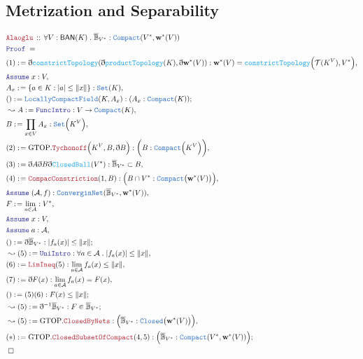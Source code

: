 \documentclass[12pt]{scrartcl}
\newcommand{\TYPE}[1]{\textcolor{NavyBlue}{\mathtt{#1}}}
\newcommand{\FUNC}[1]{\textcolor{Cerulean}{\mathtt{#1}}}
\newcommand{\LOGIC}[1]{\textcolor{Blue}{\mathtt{#1}}}
\newcommand{\THM}[1]{\textcolor{Maroon}{\mathtt{#1}}}
\renewcommand{\.}{\; . \;}
\newcommand{\de}{: \kern 0.1pc =}
\newcommand{\Theorem}[2]{& \THM{#1} \, :: \, #2 \\ & \Proof = \\ }
\newcommand{\Page}[1]{\begin{align*} #1 \end{align*} \newpage   }
\newcommand{ \bd }{ \ByDef }
\newcommand{\Say}[3]{& #1 \de #2 : #3, \\}
\newcommand{\Conclude}[3]{& #1 \de #2 : #3; \\}
\newcommand{\Derive}[3]{& \leadsto #1 \de #2 : #3, \\}
\newcommand{\DeriveConclude}[3]{& \leadsto #1 \de #2 : #3 ; \\}
\newcommand{\A}{\LOGIC{Assume} \;}
\newcommand{\Assume}[2]{& \A #1 : #2, \\}
\newcommand{\QED}{\; \square}
\newcommand{\EndProof}{& \QED \\}
\newcommand{\ByDef}{\eth}
\newcommand{\Proof}{\LOGIC{Proof} \; }
\newcommand{\BAN}{\textsf{BAN}}
\begin{document}
\subsection{Metrization and Separability }
\Page{
\Theorem{Alaoglu}{\forall V : \BAN(K) \. \overline{\mathbb{B}}_{V^*} : \TYPE{Compact}(V^*, \mathbf{w}^*(V)) }
\Say{(1)}{\bd \FUNC{constrictTopology} (\bd \FUNC{productTopology}(K),\bd \mathbf{w}^*(V))}{
\mathbf{w}^*(V) =  \FUNC{constrictTopology}\Big(\mathcal{T}(K^V),V^*\Big) 
}
\Assume{x}{V}
\Say{ A_x}{ \{ a \in K  : | a | \le \| x \|    \}}{ \TYPE{Set}(K)}
\Conclude{()}{\TYPE{LocallyCompactField}(K,A_x)}{(A_x : \TYPE{Compact}(K))}
\Derive{A}{\LOGIC{FuncIntro}}{V \to \TYPE{Compact}({K})}
\Say{B}{\prod_{x \in V} A_x}{\TYPE{Set}\Big(K^V \Big)}
\Say{(2)}{\mathrm{GTOP.}\THM{Tychonoff}\Big( K^V,B,\bd B \Big)}{\bigg(B : \TYPE{Compact}\Big(K^V \Big) \bigg)}
\Say{(3)}{\bd A \bd B \bd \FUNC{ClosedBall}(V^*)}{  \overline{\mathbb{B}}_{V^*}  \subset B }
\Say{(4)}{\THM{CompacConstriction}(1,B)}{ \Big( B \cap V^* : \TYPE{Compact}\big(\mathbf{w}^*(V)\big) \Big)}
\Assume{(\mathcal{A},f)}{\TYPE{ConverginNet}( \overline{\mathbb{B}}_{V^*}, \mathbf{w}^*(V))}
\Say{F}{\lim_{ a \in \mathcal{A}}}{V^*}
\Assume{x}{V}
\Assume{a}{\mathcal{A}}
\Conclude{()}{ \bd \overline{\mathbb{B}}_{V^*}  }{ |f_a(x)| \le \| x \| }
\Derive{(5)}{\LOGIC{UniIntro}}{ \forall a \in \mathcal{A} \. |f_a(x)| \le \| x \| }
\Say{(6)}{ \THM{LimIneq}(5)  }{\lim_{a \in \mathcal{A}} f_a(x) \le \| x \|}
\Say{(7)}{ \bd F(x)}{ \lim_{a \in \mathcal{A}} f_a(x) = F(x)}
\Conclude{()}{(5)(6)}{ F(x) \le \| x \|}
\DeriveConclude{(5)}{\bd^{-1}  \overline{\mathbb{B}}_{V^*} }{ F \in  \overline{\mathbb{B}}_{V^*}}
\Derive{(5)}{\mathrm{GTOP.}\THM{ClosedByNets}}{\Big(\overline{\mathbb{B}}_{V^*} : \TYPE{Closed}\big(\mathbf{w}^*(V)\big) \Big)}
\Conclude{(*)}{\mathrm{GTOP.}\THM{ClosedSubsetOfCompact}(4,5)}{\Big( \overline{\mathbb{B}}_{V^*} : \TYPE{Compact}(V^*, \mathbf{w}^*(V)) \Big)}
\EndProof
}
\end{document}
